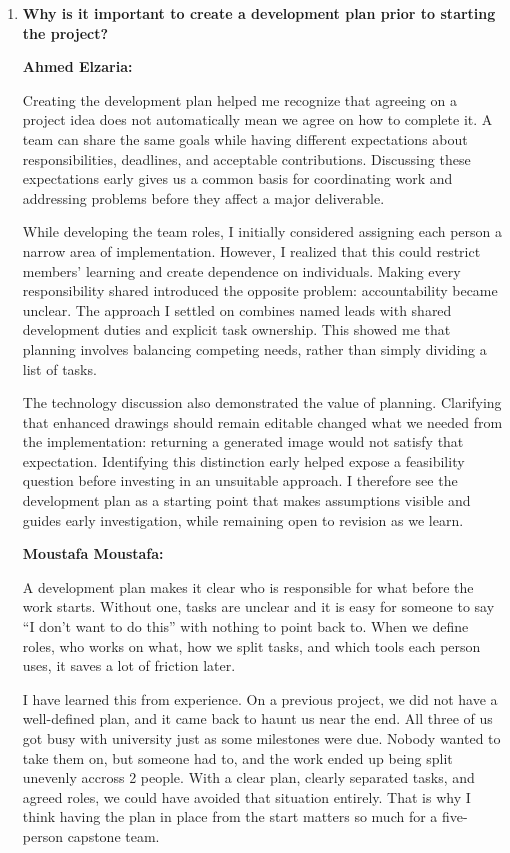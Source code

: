 \documentclass{article}
\begin{document}
\begin{enumerate}

    \item \textbf{Why is it important to create a development plan
    prior to starting the project?}

    \textbf{Ahmed Elzaria:}

    Creating the development plan helped me recognize that agreeing
    on a project idea does not automatically mean we agree on how
    to complete it. A team can share the same goals while having
    different expectations about responsibilities, deadlines, and
    acceptable contributions. Discussing these expectations early
    gives us a common basis for coordinating work and addressing
    problems before they affect a major deliverable.

    While developing the team roles, I initially considered
    assigning each person a narrow area of implementation.
    However, I realized that this could restrict members'
    learning and create dependence on individuals. Making every
    responsibility shared introduced the opposite problem:
    accountability became unclear. The approach I settled on
    combines named leads with shared development duties and
    explicit task ownership. This showed me that planning
    involves balancing competing needs, rather than simply
    dividing a list of tasks.

    The technology discussion also demonstrated the value of
    planning. Clarifying that enhanced drawings should remain
    editable changed what we needed from the implementation:
    returning a generated image would not satisfy that
    expectation. Identifying this distinction early helped
    expose a feasibility question before investing in an
    unsuitable approach. I therefore see the development plan
    as a starting point that makes assumptions visible and
    guides early investigation, while remaining open to revision
    as we learn.

    \textbf{Moustafa Moustafa:}

    A development plan makes it clear who is responsible for what
    before the work starts. Without one, tasks are unclear and it
    is easy for someone to say ``I don't want to do this'' with
    nothing to point back to. When we define roles, who works on
    what, how we split tasks, and which tools each person uses,
    it saves a lot of friction later.

    I have learned this from experience. On a previous project, we
    did not have a well-defined plan, and it came back to haunt us
    near the end. All three of us got busy with university just as
    some milestones were due. Nobody wanted to take them on, but
    someone had to, and the work ended up being split unevenly accross 2 people.
    With a clear plan, clearly separated tasks, and agreed
    roles, we could have avoided that situation entirely. That is
    why I think having the plan in place from the start matters so
    much for a five-person capstone team.


\end{enumerate}
\end{document}
